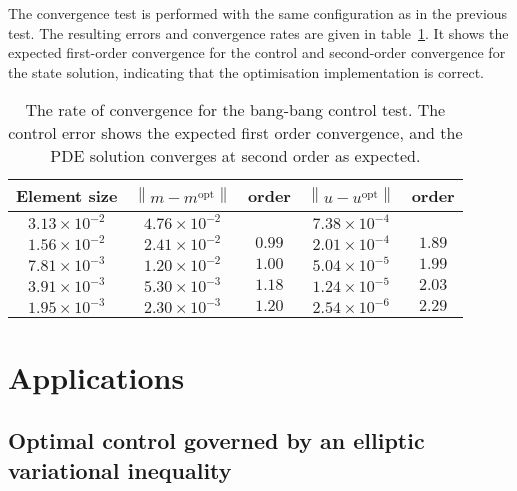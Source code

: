 \documentclass[prodmode,acmtoms]{acmsmall}
\begin{document}
The convergence test is performed with the same configuration as in the previous test. 
The resulting errors and convergence rates are given in table~\ref{fig:rate_of_convergence_bang_bang}.
It shows the expected first-order convergence for the control and second-order convergence for the state solution,
indicating that the optimisation implementation is correct.

\begin{table}
\centering
  \begin{tabular}{ccccc}
    Element size & \small{$\left\| m - m^{\mathrm{opt}}\right\|$} & order & \small{$\left\|u-u^{\mathrm{opt}} \right\|$} & order \\
    \hline
    $3.13 \times 10^{-2}$ & $4.76 \times 10^{-2}$ &  & $7.38 \times 10^{-4}$ & \\
    $1.56 \times 10^{-2}$ & $2.41 \times 10^{-2}$ & $0.99$ & $2.01 \times 10^{-4}$ & $1.89$ \\
    $7.81 \times 10^{-3}$ & $1.20 \times 10^{-2}$ & $1.00$ & $5.04 \times 10^{-5}$ & $1.99$ \\
    $3.91 \times 10^{-3}$ & $5.30 \times 10^{-3}$ & $1.18$ & $1.24 \times 10^{-5}$ & $2.03$ \\
    $1.95 \times 10^{-3}$ & $2.30 \times 10^{-3}$ & $1.20$ & $2.54 \times 10^{-6}$ & $2.29$ \\
  \end{tabular}
\caption{The rate of convergence for the bang-bang control test. The control error shows the expected first order convergence,
and the PDE solution converges at second order as expected.}
\label{fig:rate_of_convergence_bang_bang}
\end{table}

\section{Applications}\label{sec:applications}

\subsection{Optimal control governed by an elliptic variational inequality} \label{sec:mpec}
\end{document}
